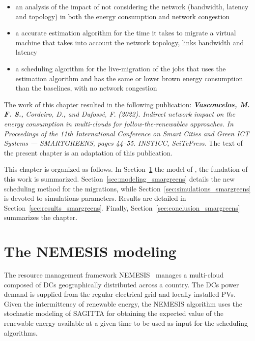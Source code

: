 \begin{itemize}
    \item an analysis of the impact of not considering the network (bandwidth, latency and topology) in both the energy consumption and network congestion
    \item a accurate estimation algorithm for the time it takes to migrate a virtual machine that takes into account the network topology, links bandwidth and latency
    \item a scheduling algorithm for the live-migration of the jobs that uses the estimation algorithm and has the same or lower brown energy consumption than the baselines, with no network congestion
\end{itemize}



The work of this chapter resulted in the following publication:  \textit{\textbf{Vasconcelos, M. F. S.}, Cordeiro, D., and Dufossé, F. (2022). Indirect network impact on the energy consumption in multi-clouds for follow-the-renewables approaches. In Proceedings of the 11th International Conference on Smart Cities and Green ICT Systems — SMARTGREENS, pages 44–55. INSTICC, SciTePress}. The text of the present chapter is an adaptation of this publication.

This chapter is organized as follows. In Section~\ref{sec:nemesis} the model of \cite{NEMESIS}, the fundation of this work is summarized. Section~\ref{sec:modeling_smargreens} details the new scheduling method for the migrations, while Section~\ref{sec:simulations_smargreens} is devoted to simulations parameters. Results are detailed in Section~\ref{sec:results_smargreens}. Finally, Section~\ref{sec:conclusion_smargreens} summarizes the chapter.


\section{The NEMESIS modeling}
\label{sec:nemesis}

The resource management framework NEMESIS~\cite{NEMESIS} manages a multi-cloud composed of DCs geographically
distributed across a country. The DCs power demand is supplied from
the regular electrical grid and locally installed PVs. Given the
intermittency of renewable energy, the NEMESIS algorithm uses the
stochastic modeling of SAGITTA \cite{SAGITTA} for obtaining the
expected value of the renewable energy available at a given time to be
used as input for the scheduling algorithms.

